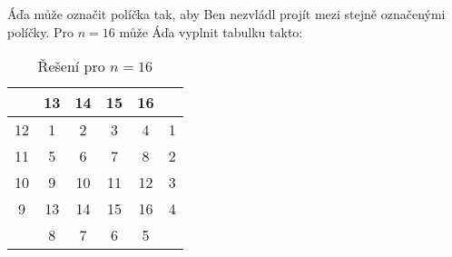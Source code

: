 \documentclass{fkssolpub}
\author{Ondřej Sedláček}
\begin{document}
Áďa může označit políčka tak, aby Ben nezvládl projít mezi
stejně označenými políčky. Pro $n = 16$ může Áďa vyplnit tabulku
takto:

\begin{table}[h!]
	\label{tab:1}
	\centering
	\begin{tabular}[c]{|c|c|c|c|c|c|}
		\hline
		   & 13 & 14 & 15 & 16 &   \\
		\hline
		12 & 1  & 2  & 3  & 4  & 1 \\
		\hline
		11 & 5  & 6  & 7  & 8  & 2 \\
		\hline
		10 & 9  & 10 & 11 & 12 & 3 \\
		\hline
		9  & 13 & 14 & 15 & 16 & 4 \\
		\hline
		   & 8  & 7  & 6  & 5  &   \\
		\hline
	\end{tabular}
	\caption{Řešení pro $n = 16$}
\end{table}
\end{document}
